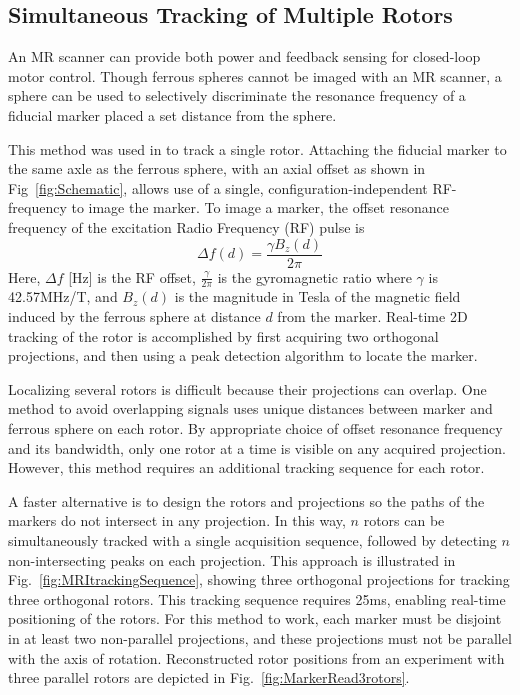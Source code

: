 \subsection{Simultaneous Tracking of Multiple Rotors}\label{subsec:FeedbackSensing}
An MR scanner can provide both power and feedback sensing for closed-loop motor control. Though ferrous spheres cannot be imaged with an MR scanner, a sphere can be used to selectively discriminate the resonance frequency of a fiducial marker placed a set distance from the sphere.

This method was used in \cite{Vartholomeos2013} to track a single rotor.  Attaching the fiducial marker to the same axle as the ferrous sphere, with an axial offset as shown in Fig~\ref{fig:Schematic}, allows use of a single, configuration-independent RF-frequency to image the marker.
To image a marker, the offset resonance frequency of the excitation Radio Frequency (RF) pulse is
\begin{equation}
\Delta f(d) = \frac{\gamma B_z(d)}{2\pi}
\label{eq:resonanceFreq}
\end{equation}
Here, $\Delta f$ [Hz] is the RF offset, $\frac{\gamma}{2\pi}$ is the gyromagnetic ratio where $\gamma$ is 42.57MHz/T, and $B_z(d)$ is the magnitude in Tesla of the magnetic field induced by the ferrous sphere at distance $d$ from the marker.
Real-time 2D tracking of the rotor is accomplished by first acquiring two orthogonal projections, and then using a peak detection algorithm to locate the marker.

Localizing several rotors is difficult because their projections can overlap.  One method to avoid overlapping signals uses unique distances between marker and ferrous sphere on each rotor. 
 By appropriate choice of offset resonance frequency and its bandwidth, only one rotor at a time is visible on any acquired projection. However, this method requires an additional tracking sequence for each rotor.   

A faster alternative is to design the rotors and projections so the paths of the markers do not intersect in any projection. In this way, $n$ rotors can be simultaneously tracked with a single acquisition sequence, followed by detecting $n$ non-intersecting peaks on each projection. This approach is illustrated in Fig.~\ref{fig:MRItrackingSequence}, showing three orthogonal projections for tracking three orthogonal rotors.  This tracking sequence requires 25ms, enabling real-time positioning of the rotors.
For this method to work, each marker must be disjoint in at least two non-parallel projections, and these projections must not be parallel with the axis of rotation. Reconstructed rotor positions from an experiment with three parallel rotors are depicted in Fig.~\ref{fig:MarkerRead3rotors}. 


